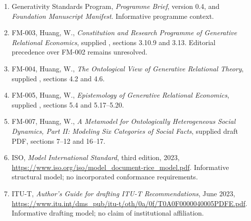 \documentclass[11pt,a4paper]{article}
\begin{document}
\GSPbibliography
\begin{enumerate}
\item Generativity Standards Program, \emph{Programme Brief}, version 0.4, and \emph{Foundation Manuscript Manifest}. Informative programme context.
\item FM-003, Huang, W., \emph{Constitution and Research Programme of Generative Relational Economics}, supplied , sections 3.10.9 and 3.13. Editorial precedence over FM-002 remains unresolved.
\item FM-004, Huang, W., \emph{The Ontological View of Generative Relational Theory}, supplied , sections 4.2 and 4.6.
\item FM-005, Huang, W., \emph{Epistemology of Generative Relational Economics}, supplied , sections 5.4 and 5.17--5.20.
\item FM-007, Huang, W., \emph{A Metamodel for Ontologically Heterogeneous Social Dynamics, Part II: Modeling Six Categories of Social Facts}, supplied draft PDF, sections 7--12 and 16--17.
\item ISO, \emph{Model International Standard}, third edition, 2023, \url{https://www.iso.org/iso/model_document-rice_model.pdf}. Informative structural model; no incorporated conformance requirements.
\item ITU-T, \emph{Author's Guide for drafting ITU-T Recommendations}, June 2023, \url{https://www.itu.int/dms_pub/itu-t/oth/0a/0f/T0A0F0000040005PDFE.pdf}. Informative drafting model; no claim of institutional affiliation.
\end{enumerate}
\end{document}
